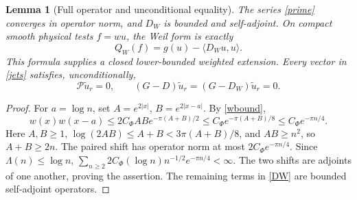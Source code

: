 \documentclass[11pt]{article}
\newtheorem{lemma}[theorem]{Lemma}
\theoremstyle{remark}
\begin{document}
\begin{lemma}[Full operator and unconditional equality]\label{equality}
The series \eqref{prime} converges in operator norm, and \(D_W\)
is bounded and self-adjoint. On compact smooth physical tests \(f=wu\),
the Weil form is exactly
\begin{equation}\label{weil}
 Q_W(f)=g(u)-\langle D_Wu,u\rangle.
\end{equation}
This formula supplies a closed lower-bounded weighted extension.
Every vector in \eqref{jets} satisfies, unconditionally,
\begin{equation}\label{annihilate}
 \mathcal P\widetilde u_r=0,\qquad
 (G-D)\widetilde u_r=(G-D_W)\widetilde u_r=0.
\end{equation}
\end{lemma}
\begin{proof}
For \(a=\log n\), set \(A=e^{2|x|}\), \(B=e^{2|x-a|}\).
By \eqref{wbound},
\[
 w(x)w(x-a)\le2C_\Phi AB e^{-\pi(A+B)/2}
                   \le C_\Phi e^{-\pi(A+B)/8}
                   \le C_\Phi e^{-\pi n/4}.
\]
Here \(A,B\ge1\), \(\log(2AB)\le A+B<3\pi(A+B)/8\),
and \(AB\ge n^2\), so \(A+B\ge2n\).
The paired shift has operator norm at most
\(2C_\Phi e^{-\pi n/4}\).
Since \(\Lambda(n)\le\log n\),
\(\sum_{n\ge2}2C_\Phi(\log n)n^{-1/2}e^{-\pi n/4}<\infty\).
The two shifts are adjoints of one another, proving the assertion.
The remaining terms in \eqref{DW} are bounded self-adjoint operators.


\end{proof}
\end{document}
